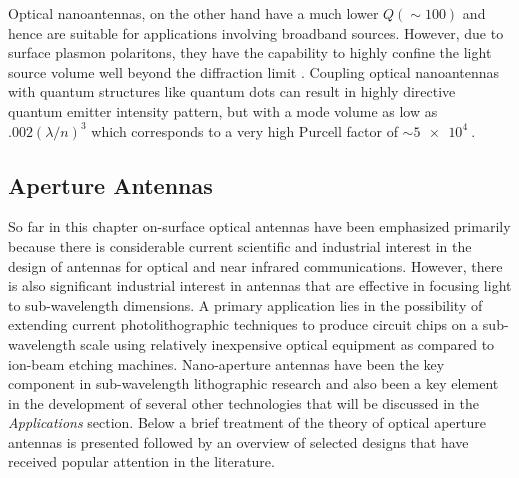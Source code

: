 \documentclass[11pt]{article}
\begin{document}
Optical nanoantennas, on the other hand have a much lower $Q (\sim 100)$ \cite{curtothesis} and hence are suitable for applications involving broadband sources. However, due to surface plasmon polaritons, they have the capability to highly confine the light source volume well beyond the diffraction limit \cite{Maier2006,Barthes2011}. Coupling optical nanoantennas with quantum structures like quantum dots can result in highly directive quantum emitter intensity pattern, but with a mode volume as low as $.002 \left(\lambda/n \right)^3$ \cite{curtothesis} which corresponds to a very high Purcell factor of $\sim \SI{5e4}{}$.
\subsection{Aperture Antennas}
%
So far in this chapter on-surface optical antennas have been emphasized primarily because there is considerable current scientific and industrial interest in the design of antennas for optical and near infrared communications. However, there is also significant industrial interest in antennas that are effective in focusing light to sub-wavelength dimensions. A primary application lies in the possibility of extending current photolithographic techniques to produce circuit chips on a sub-wavelength scale using relatively inexpensive optical equipment as compared to ion-beam etching machines. Nano-aperture antennas have been the key component in sub-wavelength lithographic research and also been a key element in the development of several other technologies that will be discussed in the \emph{Applications} section. Below a brief treatment of the theory of optical aperture antennas is presented followed by an overview of selected designs that have received popular attention in the literature.
\end{document}
